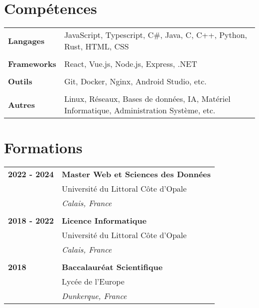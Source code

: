 \documentclass[a4paper, 12pt]{article}
\begin{document}
	\begin{minipage}[t]{0.65\textwidth}
		
		\section*{\textcolor{sectioncolor}{Compétences}}
		\begin{tabular}{ m{} m{} }
			\textbf{Langages} & JavaScript, Typescript, C\#, Java, C, C++, Python, Rust, HTML, CSS \\
			& \\
			\textbf{Frameworks} & React, Vue.js, Node.js, Express, .NET \\
			& \\
			\textbf{Outils} & Git, Docker, Nginx, Android Studio, etc. \\
			& \\
			\textbf{Autres} & Linux, Réseaux, Bases de données, IA, Matériel Informatique, Administration Système, etc. \\
		\end{tabular}
		
		\vspace{-0.4cm}
		
		\section*{\textcolor{sectioncolor}{Formations}}
		\begin{tabular}{ m{} m{} }
			\textbf{2022 - 2024} & \textbf{Master Web et Sciences des Données} \\
			& Université du Littoral Côte d'Opale \\
			& \textit{Calais, France} \\
			& \\
			\textbf{2018 - 2022} & \textbf{Licence Informatique} \\
			& Université du Littoral Côte d'Opale \\
			& \textit{Calais, France} \\
			& \\
			\textbf{2018} & \textbf{Baccalauréat Scientifique} \\
			& Lycée de l'Europe \\
			& \textit{Dunkerque, France} \\
		\end{tabular}
		
		\vspace{-0.4cm}
		

\end{minipage}
\end{document}
